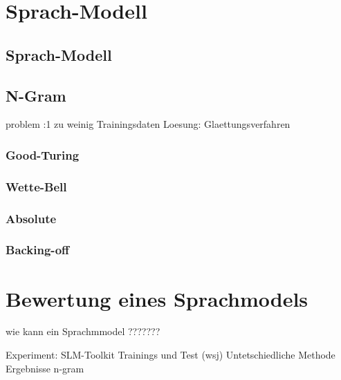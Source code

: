 \chapter{Sprach-Modell}
\label{chapter:Sprach-Modell}

\section{Sprach-Modell}
	

\section{N-Gram}
 problem :1 zu weinig Trainingsdaten
 Loesung: Glaettungsverfahren
		
		\subsection{Good-Turing}
		\subsection{Wette-Bell}
		\subsection{Absolute}
		\subsection{Backing-off}
		
\chapter{Bewertung eines Sprachmodels}
\label{chapter:bewertung_sprachmodel}
wie kann ein Sprachmmodel ???????

	Experiment:
		SLM-Toolkit
		Trainings und Test (wsj)
		Untetschiedliche Methode
		Ergebnisse
		   n-gram 